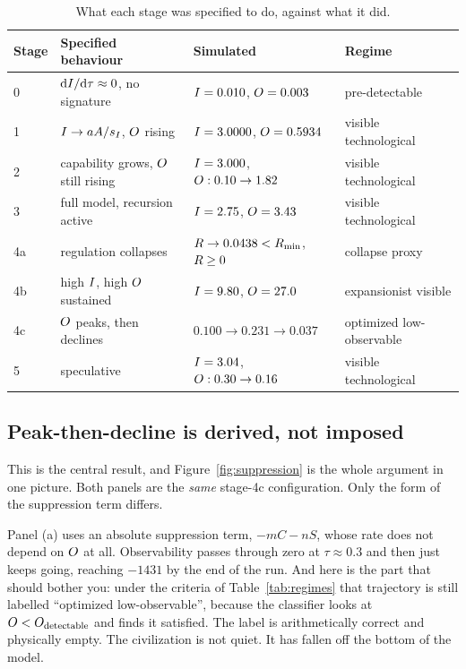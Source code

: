\begin{table}[tb]
\centering\small
\caption{What each stage was specified to do, against what it did.}
\label{tab:stagecheck}
\begin{tabular}{@{}llll@{}}
\toprule
Stage & Specified behaviour & Simulated & Regime \\
\midrule
0   & $\mathrm{d}I/\mathrm{d}\tau\approx0$, no signature & $I=0.010$, $O=0.003$ & pre-detectable \\
1   & $I\to aA/s_I$, $O$ rising & $I=3.0000$, $O=0.5934$ & visible technological \\
2   & capability grows, $O$ still rising & $I=3.000$, $O:0.10\to1.82$ & visible technological \\
3   & full model, recursion active & $I=2.75$, $O=3.43$ & visible technological \\
4a  & regulation collapses & $R\to0.0438<R_{\mathrm{min}}$, $R\geq0$ & collapse proxy \\
4b  & high $I$, high $O$ sustained & $I=9.80$, $O=27.0$ & expansionist visible \\
4c  & $O$ peaks, then declines & $0.100\to0.231\to0.037$ & optimized low-observable \\
5   & speculative & $I=3.04$, $O:0.30\to0.16$ & visible technological \\
\bottomrule
\end{tabular}
\end{table}

\subsection{Peak-then-decline is derived, not imposed}
\label{sec:derived}

This is the central result, and Figure~\ref{fig:suppression} is the whole
argument in one picture. Both panels are the \emph{same} stage-4c
configuration. Only the form of the suppression term differs.

Panel (a) uses an absolute suppression term, $-mC-nS$, whose rate does not
depend on $O$ at all. Observability passes through zero at $\tau\approx0.3$
and then just keeps going, reaching $-1431$ by the end of the run. And here is
the part that should bother you: under the criteria of Table~\ref{tab:regimes}
that trajectory is still labelled ``optimized low-observable'', because the
classifier looks at $O < O_{\mathrm{detectable}}$ and finds it satisfied. The label is
arithmetically correct and physically empty. The civilization is not quiet. It
has fallen off the bottom of the model.

